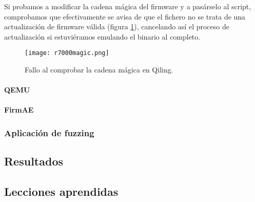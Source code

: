 Si probamos a modificar la cadena mágica del firmware y a pasárselo al script, comprobamos que efectivamente se avisa de que 
el fichero no se trata de una actualización de firmware válida (figura \ref{fig:R7000magic}), cancelando así el proceso de actualización si estuviéramos 
emulando el binario al completo.

\begin{figure}[H]
    \centering
    \texttt{[image: r7000magic.png]}
    \caption{Fallo al comprobar la cadena mágica en Qiling.}
    \label{fig:R7000magic}
\end{figure}

\paragraph{QEMU}
\paragraph{FirmAE}


\subsubsection{Aplicación de fuzzing}

\subsection{Resultados}
\subsection{Lecciones aprendidas}
